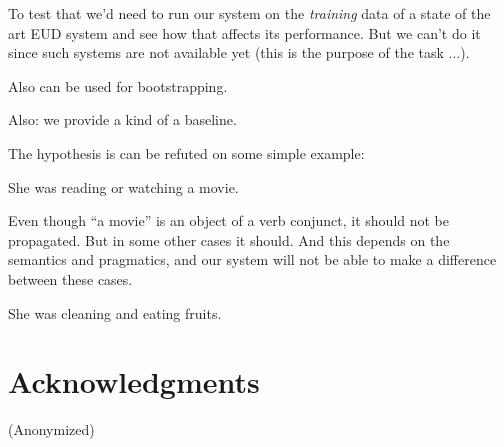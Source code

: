 \documentclass[11pt,a4paper]{article}
\begin{document}
To test that we'd need to run our system on the \emph{training} data
of a state of the art EUD system and see how that affects its
performance. But we can't do it since such systems are not available
yet (this is the purpose of the task ...).

Also can be used for bootstrapping.

Also: we provide a kind of a baseline.

The hypothesis is can be refuted on some simple example:

She was reading or watching a movie.

Even though ``a movie'' is an object of a verb conjunct, it should not
be propagated. But in some other cases it should. And this depends on
the semantics and pragmatics, and our system will not be able to make
a difference between these cases.

She was cleaning and eating fruits.

\section*{Acknowledgments}

(Anonymized)



\end{document}
